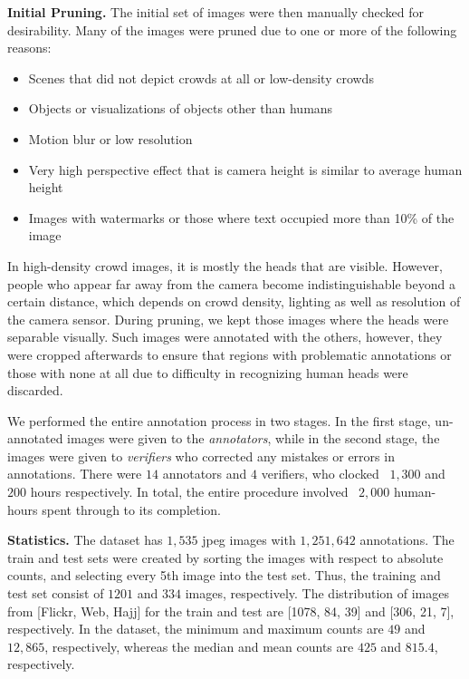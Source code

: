 \documentclass[runningheads]{llncs}
\begin{document}
\noindent\textbf{Initial Pruning.} The initial set of images were then manually checked for desirability. Many of the images were pruned due to one or more of the following reasons:
\begin{itemize}[noitemsep]
  \item Scenes that did not depict crowds at all or low-density crowds
  \item Objects or visualizations of objects other than humans
  \item Motion blur or low resolution
\item Very high perspective effect that is camera height is similar to average human height
  \item Images with watermarks or those where text occupied more than 10\% of the image
\end{itemize}

In high-density crowd images, it is mostly the heads that are visible. However, people who appear far away from the camera become indistinguishable beyond a certain distance, which depends on crowd density, lighting as well as resolution of the camera sensor. During pruning, we kept those images where the heads were separable visually. Such images were annotated with the others, however, they were cropped afterwards to ensure that regions with problematic annotations or those with none at all due to difficulty in recognizing human heads were discarded.







We performed the entire annotation process in two stages. In the first stage, un-annotated images were given to the \textit{annotators}, while in the second stage, the images were given to \textit{verifiers} who corrected any mistakes or errors in annotations. There were $14$ annotators and $4$ verifiers, who clocked ~$1,300$ and ~$200$ hours respectively. In total, the entire procedure involved ~$2,000$ human-hours spent through to its completion.
\vskip 0.1in

\noindent\textbf{Statistics.} The dataset has $1,535$ jpeg images with $1,251,642$ annotations. The train and test sets were created by sorting the images with respect to absolute counts, and selecting every 5th image into the test set. Thus, the training and test set consist of $1201$ and $334$ images, respectively. The distribution of images from [Flickr, Web, Hajj] for the train and test are [1078, 84, 39] and [306, 21, 7], respectively. In the dataset, the minimum and maximum counts are $49$ and $12,865$, respectively, whereas the median and mean counts are $425$ and $815.4$, respectively.
\end{document}

